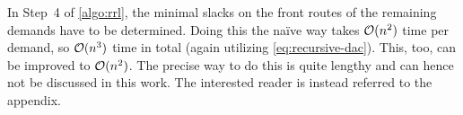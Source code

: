 In Step~4 of \cref{algo:rrl}, the minimal slacks on the front routes of the remaining demands have to be determined.
Doing this the naïve way takes $\mathcal{O}(n^2)$ time per demand, so $\mathcal{O}(n^3)$ time in total (again utilizing \cref{eq:recursive-dac}).
This, too, can be improved to $\mathcal{O}(n^2)$.
The precise way to do this is quite lengthy and can hence not be discussed in this work. 
The interested reader is instead referred to the appendix.